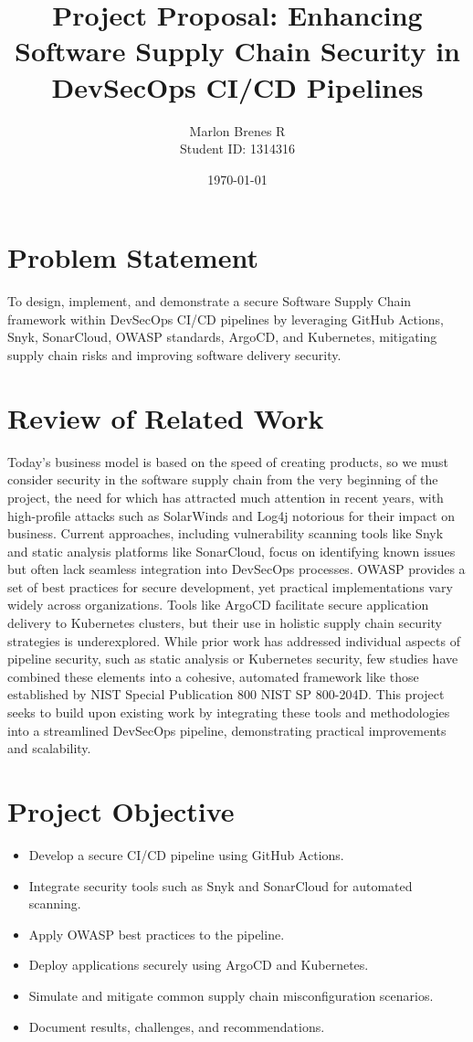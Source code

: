 \documentclass[a4paper,12pt]{article}
\title{Project Proposal: Enhancing Software Supply Chain Security in DevSecOps CI/CD Pipelines}
\author{Marlon Brenes R \\
        Student ID: 1314316}
\date{\today}
\begin{document}
\maketitle

\section{Problem Statement}
To design, implement, and demonstrate a secure Software Supply Chain framework within DevSecOps CI/CD pipelines by leveraging GitHub Actions, Snyk, SonarCloud, OWASP standards, ArgoCD, and Kubernetes, mitigating supply chain risks and improving software delivery security.

\section{Review of Related Work}
Today's business model is based on the speed of creating products, so we must consider security in the software supply chain from the very beginning of the project, the need for which has attracted much attention in recent years, with high-profile attacks such as SolarWinds and Log4j notorious for their impact on business. Current approaches, including vulnerability scanning tools like Snyk and static analysis platforms like SonarCloud, focus on identifying known issues but often lack seamless integration into DevSecOps processes. 
OWASP provides a set of best practices for secure development, yet practical implementations vary widely across organizations. Tools like ArgoCD facilitate secure application delivery to Kubernetes clusters, but their use in holistic supply chain security strategies is underexplored.
While prior work has addressed individual aspects of pipeline security, such as static analysis or Kubernetes security, few studies have combined these elements into a cohesive, automated framework like those established by NIST Special Publication 800 NIST SP 800-204D. This project seeks to build upon existing work by integrating these tools and methodologies into a streamlined DevSecOps pipeline, demonstrating practical improvements and scalability.

\section{Project Objective}
\begin{itemize}
    \item Develop a secure CI/CD pipeline using GitHub Actions.
    \item Integrate security tools such as Snyk and SonarCloud for automated scanning.
    \item Apply OWASP best practices to the pipeline.
    \item Deploy applications securely using ArgoCD and Kubernetes.
    \item Simulate and mitigate common supply chain misconfiguration scenarios.
    \item Document results, challenges, and recommendations.
\end{itemize}
\end{document}

